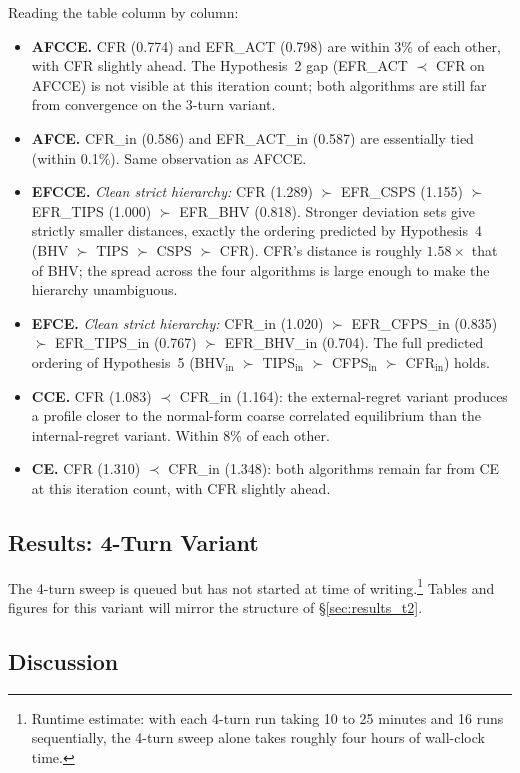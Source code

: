 \documentclass[11pt]{article}
\begin{document}
Reading the table column by column:
\begin{itemize}
    \item \textbf{AFCCE.} CFR (0.774) and EFR\_ACT (0.798) are within 3\% of each other, with CFR slightly ahead. The Hypothesis~2 gap (EFR\_ACT $\prec$ CFR on AFCCE) is not visible at this iteration count; both algorithms are still far from convergence on the 3-turn variant.
    \item \textbf{AFCE.} CFR\_in (0.586) and EFR\_ACT\_in (0.587) are essentially tied (within 0.1\%). Same observation as AFCCE.
    \item \textbf{EFCCE.} \emph{Clean strict hierarchy:} CFR (1.289) $\succ$ EFR\_CSPS (1.155) $\succ$ EFR\_TIPS (1.000) $\succ$ EFR\_BHV (0.818). Stronger deviation sets give strictly smaller distances, exactly the ordering predicted by Hypothesis~4 (BHV $\succ$ TIPS $\succ$ CSPS $\succ$ CFR). CFR's distance is roughly $1.58\times$ that of BHV; the spread across the four algorithms is large enough to make the hierarchy unambiguous.
    \item \textbf{EFCE.} \emph{Clean strict hierarchy:} CFR\_in (1.020) $\succ$ EFR\_CFPS\_in (0.835) $\succ$ EFR\_TIPS\_in (0.767) $\succ$ EFR\_BHV\_in (0.704). The full predicted ordering of Hypothesis~5 (BHV$_\text{in}$ $\succ$ TIPS$_\text{in}$ $\succ$ CFPS$_\text{in}$ $\succ$ CFR$_\text{in}$) holds.
    \item \textbf{CCE.} CFR (1.083) $\prec$ CFR\_in (1.164): the external-regret variant produces a profile closer to the normal-form coarse correlated equilibrium than the internal-regret variant. Within 8\% of each other.
    \item \textbf{CE.} CFR (1.310) $\prec$ CFR\_in (1.348): both algorithms remain far from CE at this iteration count, with CFR slightly ahead.
\end{itemize}

\subsection{Results: 4-Turn Variant}

The 4-turn sweep is queued but has not started at time of writing.\footnote{Runtime estimate: with each 4-turn run taking 10 to 25 minutes and 16 runs sequentially, the 4-turn sweep alone takes roughly four hours of wall-clock time.} Tables and figures for this variant will mirror the structure of \S\ref{sec:results_t2}.

\subsection{Discussion}
\label{sec:eqdist_disc}
\end{document}
